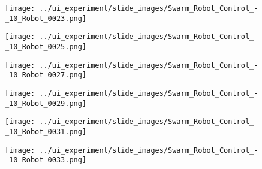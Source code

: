 \begin{minipage}{\linewidth}
	\centering
	\begin{minipage}{0.42\linewidth}
		\texttt{[image: ../ui\_experiment/slide\_images/Swarm\_Robot\_Control\_-\_10\_Robot\_0023.png]}
		\label{fig:sub1}
	\end{minipage}
	\hspace{0.05\linewidth}
	\begin{minipage}{0.42\linewidth}
		\texttt{[image: ../ui\_experiment/slide\_images/Swarm\_Robot\_Control\_-\_10\_Robot\_0025.png]}
		\label{fig:sub1}
	\end{minipage}
\end{minipage}

\begin{minipage}{\linewidth}
	\centering
	\begin{minipage}{0.42\linewidth}
		\texttt{[image: ../ui\_experiment/slide\_images/Swarm\_Robot\_Control\_-\_10\_Robot\_0027.png]}
		\label{fig:sub2}
	\end{minipage}
	\hspace{0.05\linewidth}
	\begin{minipage}{0.42\linewidth}
		\texttt{[image: ../ui\_experiment/slide\_images/Swarm\_Robot\_Control\_-\_10\_Robot\_0029.png]}
		\label{fig:sub1}
	\end{minipage}
\end{minipage}

\begin{minipage}{\linewidth}
	\centering
	\begin{minipage}{0.42\linewidth}
		\texttt{[image: ../ui\_experiment/slide\_images/Swarm\_Robot\_Control\_-\_10\_Robot\_0031.png]}
		\label{fig:sub2}
	\end{minipage}
	\hspace{0.05\linewidth}
	\begin{minipage}{0.42\linewidth}
		\texttt{[image: ../ui\_experiment/slide\_images/Swarm\_Robot\_Control\_-\_10\_Robot\_0033.png]}
		\label{fig:sub1}
	\end{minipage}
\end{minipage}
	
